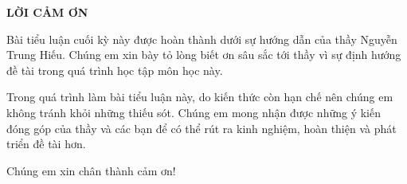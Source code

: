 \documentclass[fontsize=12pt,a4paper,oneside,DIV=calc, chapterprefix=true]{scrbook} %
\numberwithin{equation}{section}  %
\theoremstyle{definition}
\theoremstyle{plain}
\theoremstyle{remark}
\theoremstyle{definition}
\begin{document}
\setcounter{secnumdepth}{4}



  

\clearpage
\thispagestyle{empty} %

\vspace*{\fill} %
{\centering \LARGE \textbf{LỜI CẢM ƠN} \par}
\vspace{2em}
Bài tiểu luận cuối kỳ này được hoàn thành dưới sự hướng dẫn của thầy Nguyễn Trung Hiếu. Chúng em xin bày tỏ lòng biết ơn sâu sắc tới thầy vì sự định hướng đề tài trong quá trình học tập môn học này.

Trong quá trình làm bài tiểu luận này, do kiến thức còn hạn chế nên chúng em không tránh khỏi những thiếu sót. Chúng em mong nhận được những ý kiến đóng góp của thầy và các bạn để có thể rút ra kinh nghiệm, hoàn thiện và phát triển đề tài hơn.

Chúng em xin chân thành cảm ơn!
\vspace{5cm}
\vspace*{\fill} %


\clearpage %
\tableofcontents

\fancyhead{}  %
\renewcommand{\footrulewidth}{0.4pt}

\pagestyle{fancy}  













\nocite{*}


\end{document}
